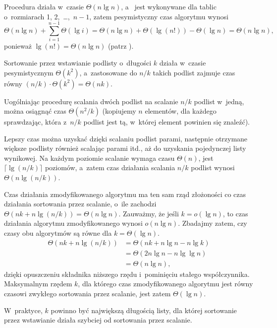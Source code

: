 Procedura  działa w~czasie $\Theta(n\lg n)$, a~ jest wykonywane dla tablic o~rozmiarach 1, 2,~\dots,~$n-1$, zatem pesymistyczny czas algorytmu  wynosi
\[
	\Theta(n\lg n)+\sum_{i=1}^{n-1}\Theta(\lg i) = \Theta(n\lg n)+\Theta(\lg(n!))-\Theta(\lg n) = \Theta(n\lg n),
\]
ponieważ $\lg(n!)=\Theta(n\lg n)$ (patrz ).

\problems


\subexercise{} %
Sortowanie przez wstawianie podlisty o~długości $k$ działa w~czasie pesymistycznym $\Theta(k^2)$, a~zastosowane do $n/k$ takich podlist zajmuje czas równy $(n/k)\cdot\Theta(k^2)=\Theta(nk)$.

\subexercise{} %
Uogólniając procedurę scalania dwóch podlist na scalanie $n/k$ podlist w~jedną, można osiągnąć czas $\Theta(n^2\!/k)$ (kopiujemy $n$ elementów, dla każdego sprawdzając, która z~$n/k$ podlist jest tą, w~której element powinien się znaleźć).

Lepszy czas można uzyskać dzięki scalaniu podlist parami, następnie otrzymane większe podlisty również scalając parami itd., aż do uzyskania pojedynczej listy wynikowej. Na każdym poziomie scalanie wymaga czasu $\Theta(n)$, jest $\lceil\lg(n/k)\rceil$ poziomów, a~zatem czas działania scalania $n/k$ podlist wynosi $\Theta(n\lg(n/k))$.

\subexercise{} %
Czas działania zmodyfikowanego algorytmu ma ten sam rząd złożoności co czas działania sortowania przez scalanie, o~ile zachodzi $\Theta(nk+n\lg(n/k))=\Theta(n\lg n)$. Zauważmy, że jeśli $k=o(\lg n)$, to czas działania algorytmu zmodyfikowanego wynosi $o(n\lg n)$. Zbadajmy zatem, czy czasy obu algorytmów są równe dla $k=\Theta(\lg n)$.
\begin{align*}
	\Theta(nk+n\lg(n/k)) &= \Theta(nk+n\lg n-n\lg k) \\
	&= \Theta(2n\lg n-n\lg\lg n) \\
	&= \Theta(n\lg n),
\end{align*}
dzięki opuszczeniu składnika niższego rzędu i~pominięciu stałego współczynnika. Maksymalnym rzędem $k$, dla którego czas zmodyfikowanego algorytmu jest równy czasowi zwykłego sortowania przez scalanie, jest zatem $\Theta(\lg n)$.

\subexercise{} %
W~praktyce, $k$ powinno być największą długością listy, dla której sortowanie przez wstawianie działa szybciej od sortowania przez scalanie.

